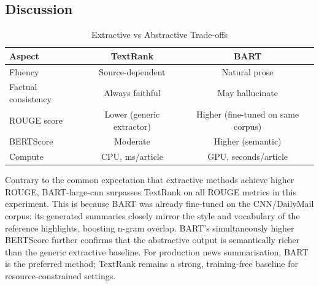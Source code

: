 \subsection{Discussion}

\begin{table}[H]
  \centering
  \caption{Extractive vs Abstractive Trade-offs}
  \label{tab:q3_discussion}
  \begin{tabular}{lcc}
    \toprule
    \textbf{Aspect} & \textbf{TextRank} & \textbf{BART} \\
    \midrule
    Fluency              & Source-dependent & Natural prose \\
    Factual consistency  & Always faithful  & May hallucinate \\
    ROUGE score          & Lower (generic extractor) & Higher (fine-tuned on same corpus) \\
    BERTScore            & Moderate         & Higher (semantic) \\
    Compute              & CPU, ms/article  & GPU, seconds/article \\
    \bottomrule
  \end{tabular}
\end{table}

Contrary to the common expectation that extractive methods achieve higher ROUGE,
BART-large-cnn surpasses TextRank on all ROUGE metrics in this experiment.
This is because BART was already fine-tuned on the CNN/DailyMail corpus:
its generated summaries closely mirror the style and vocabulary of the reference
highlights, boosting n-gram overlap.
BART's simultaneously higher BERTScore further confirms that the abstractive
output is semantically richer than the generic extractive baseline.
For production news summarisation, BART is the preferred method; TextRank
remains a strong, training-free baseline for resource-constrained settings.
